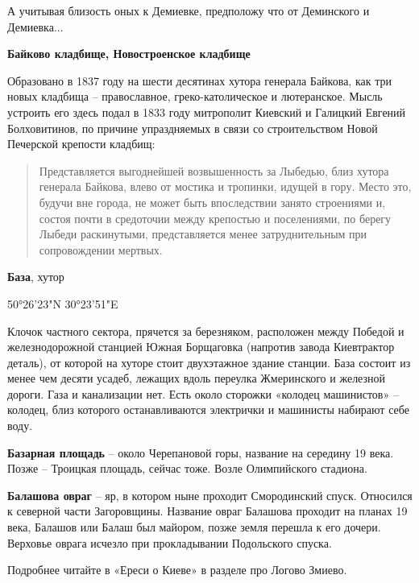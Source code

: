 А учитывая близость оных к Демиевке, предположу что от Деминского и Демиевка...\\


\medskip

\textbf{Байково кладбище, Новостроенское кладбище}

Образовано в 1837 году на шести десятинах хутора генерала Байкова, как три новых кладбища – православное, греко-католическое и лютеранское. Мысль устроить его здесь подал в 1833 году митрополит Киевский и Галицкий Евгений Болховитинов, по причине упраздняемых в связи со строительством Новой Печерской крепости кладбищ:

\begin{quotation}
Представляется выгоднейшей возвышенность за Лыбедью, близ хутора генерала Байкова, влево от мостика и тропинки, идущей в гору. Место это, будучи вне города, не может быть впоследствии занято строениями и, состоя почти в средоточии между крепостью и поселениями, по берегу Лыбеди раскинутыми, представляется менее затруднительным при сопровождении мертвых.
\end{quotation}


\medskip


\textbf{База}, хутор

50°26'23"N 30°23'51"E

Клочок частного сектора, прячется за березняком, расположен между Победой и железнодорожной станцией Южная Борщаговка (напротив завода Киевтрактор деталь), от которой на хуторе стоит двухэтажное здание станции. База состоит из менее чем десяти усадеб, лежащих вдоль переулка Жмеринского и железной дороги. Газа и канализации нет. Есть около сторожки «колодец машинистов» – колодец, близ которого останавливаются электрички и машинисты набирают себе воду.\\

\medskip


\textbf{Базарная площадь} – около Черепановой горы, название на середину 19 века. Позже – Троицкая площадь, сейчас тоже. Возле Олимпийского стадиона.\\

\medskip

\textbf{Балашова овраг} – яр, в котором ныне проходит Смородинский спуск. Относился к северной части Загоровщины. Название овраг Балашова проходит на планах 19 века, Балашов или Балаш был майором, позже земля перешла к его дочери. Верховье оврага исчезло при прокладывании Подольского спуска. 

Подробнее читайте в «Ереси о Киеве» в разделе про Логово Змиево.\\

